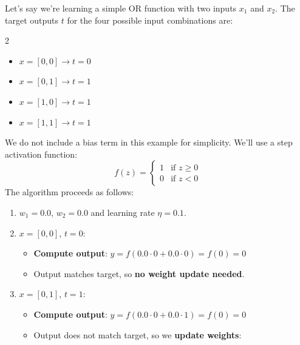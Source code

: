 \newpage

\begin{examplebox}
    Let's say we're learning a simple OR function with two inputs $x_1$ and $x_2$. The target outputs $t$ for the four possible input combinations are:
    \begin{multicols}{2}
        \begin{itemize}
            \item $x = [0, 0] \rightarrow t = 0$
            \item $x = [0, 1] \rightarrow t = 1$
            \item $x = [1, 0] \rightarrow t = 1$
            \item $x = [1, 1] \rightarrow t = 1$
        \end{itemize}
    \end{multicols}
    We do not include a bias term in this example for simplicity. We'll use a step activation function:
    \begin{equation*}
        f(z) =
        \begin{cases}
            1 & \text{if } z \geq 0 \\
            0 & \text{if } z < 0
        \end{cases}
    \end{equation*}
    The algorithm proceeds as follows:
    \begin{enumerate}
        \item {} $w_1 = 0.0$, $w_2 = 0.0$ and learning rate $\eta = 0.1$.
        \item {} $x = [0, 0]$, $t = 0$:
            \begin{itemize}
                \item[\faIcon{cogs}] \textbf{Compute output}: $y = f(0.0 \cdot 0 + 0.0 \cdot 0) = f(0) = 0$
                \item[\textcolor{Green3}{\faIcon{check-circle}}] Output matches target, so \textbf{no weight update needed}.
            \end{itemize}
        \item {} $x = [0, 1]$, $t = 1$:
            \begin{itemize}
                \item[\faIcon{cogs}] \textbf{Compute output}: $y = f(0.0 \cdot 0 + 0.0 \cdot 1) = f(0) = 0$
                \item[\textcolor{Red2}{\faIcon{times-circle}}] Output does not match target, so we \textbf{update weights}:

\end{itemize}
\end{enumerate}
\end{examplebox}
